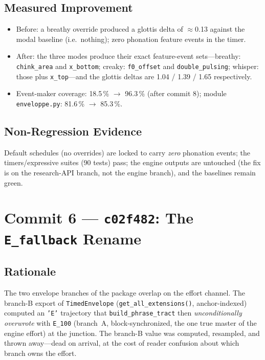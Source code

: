 \documentclass[11pt,a4paper]{article}
\newcommand{\code}[1]{\texttt{#1}}
\newcommand{\commit}[1]{\texttt{#1}}
\newcommand{\pct}[1]{{#1}\,\%}
\begin{document}
\subsection{Measured Improvement}

\begin{itemize}[leftmargin=1.4em, itemsep=0.15em]
  \item Before: a breathy override produced a glottis delta of
        $\approx$0.13 against the modal baseline (i.e.\ nothing); zero
        phonation feature events in the timer.
  \item After: the three modes produce their exact feature-event
        sets---breathy: \code{chink\_area} and \code{x\_bottom};
        creaky: \code{f0\_offset} and \code{double\_pulsing};
        whisper: those plus \code{x\_top}---and the glottis deltas
        are 1.04 / 1.39 / 1.65 respectively.
  \item Event-maker coverage: \pct{18.5} $\to$ \pct{96.3}
        (after commit 8); module \code{enveloppe.py}:
        \pct{81.6} $\to$ \pct{85.3}.
\end{itemize}

\subsection{Non-Regression Evidence}

Default schedules (no overrides) are locked to carry \emph{zero}
phonation events; the timers/expressive suites (90 tests) pass; the
engine outputs are untouched (the fix is on the research-API branch,
not the engine branch), and the baselines remain green.

\section{Commit 6 --- \commit{c02f482}: The \code{E\_fallback} Rename}
\label{sec:c6}

\subsection{Rationale}

The two envelope branches of the package overlap on the effort
channel. The branch-B export of \code{TimedEnvelope}
(\code{get\_all\_extensions()}, anchor-indexed) computed an
\code{'E'} trajectory that
\code{build\_phrase\_tract} then \emph{unconditionally overwrote}
with \code{E\_100} (branch~A, block-synchronized, the one true master
of the engine effort) at the junction. The branch-B value was
computed, resampled, and thrown away---dead on arrival, at the cost
of reader confusion about which branch owns the effort.
\end{document}
